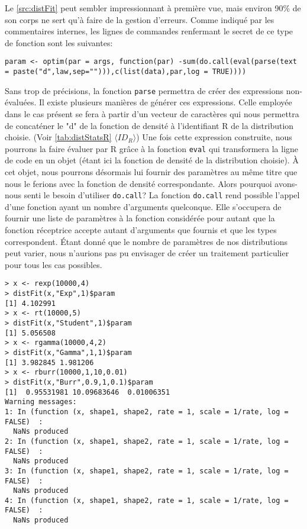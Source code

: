 Le \autoref{src:distFit} peut sembler impressionnant à première vue, mais environ 90\% de son corps ne sert qu'à faire de la gestion d'erreurs. Comme indiqué par les commentaires internes, les lignes de commandes renfermant le secret de ce type de fonction sont les suivantes: \\

\begin{minipage}{\linewidth}
	\noindent
	\texttt{param <- optim(par = args, function(par) -sum(do.call(eval(parse(text = paste("d",law,sep=""))),c(list(data),par,log = TRUE))))}
\end{minipage}

\vspace{\baselineskip}
Sans trop de précisions, la fonction \texttt{parse} permettra de créer des expressions non-évaluées. Il existe plusieurs manières de générer ces expressions. Celle employée dans le cas présent se fera à partir d'un vecteur de caractères qui nous permettra de concaténer le "d" de la fonction de densité à l'identifiant R de la distribution choisie. (Voir \autoref{tab:distStatsR} $\langle ID_R \rangle$) Une fois cette expression construite, nous pourrons la faire évaluer par R grâce à la fonction \texttt{eval} qui transformera la ligne de code en un objet (étant ici la fonction de densité de la distribution choisie). À cet objet, nous pourrons désormais lui fournir des paramètres au même titre que nous le ferions avec la fonction de densité correspondante. Alors pourquoi avons-nous senti le besoin d'utiliser \texttt{do.call}? La fonction \texttt{do.call} rend possible l'appel d'une fonction ayant un nombre d'arguments quelconque. Elle s'occupera de fournir une liste de paramètres à la fonction considérée pour autant que la fonction réceptrice accepte autant d'arguments que fournis et que les types correspondent. Étant donné que le nombre de paramètres de nos distributions peut varier, nous n'aurions pas pu envisager de créer un traitement particulier pour tous les cas possibles.

\begin{lstlisting}[caption = Exemple d'utilisation de la fonction \texttt{distFit},label=src:distFitEx]
> x <- rexp(10000,4)
> distFit(x,"Exp",1)$param
[1] 4.102991
> x <- rt(10000,5)
> distFit(x,"Student",1)$param
[1] 5.056508
> x <- rgamma(10000,4,2)
> distFit(x,"Gamma",1,1)$param
[1] 3.982845 1.981206
> x <- rburr(10000,1,10,0.01)
> distFit(x,"Burr",0.9,1,0.1)$param
[1]  0.95531981 10.09683646  0.01006351
Warning messages:
1: In (function (x, shape1, shape2, rate = 1, scale = 1/rate, log = FALSE)  :
  NaNs produced
2: In (function (x, shape1, shape2, rate = 1, scale = 1/rate, log = FALSE)  :
  NaNs produced
3: In (function (x, shape1, shape2, rate = 1, scale = 1/rate, log = FALSE)  :
  NaNs produced
4: In (function (x, shape1, shape2, rate = 1, scale = 1/rate, log = FALSE)  :
  NaNs produced
\end{lstlisting}

